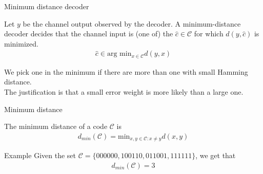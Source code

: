 \begin{parag}{Minimum distance decoder}
    \begin{definition}
        Let $y$ be the channel output observed by the decoder. A minimum-distance decoder decides that the channel input is (one of) the $\hat{c} \in \mathcal{C}$ for which $d\left(y, \hat{c}\right)$ is minimized.
        \begin{align*} \hat{c} \in \text{arg } \text{min}_{x \in \mathcal{C}}d\left(y, x\right)  \end{align*}
    \end{definition}
    We pick one in the minimum if there are more than one with small Hamming distance.\\
    The justification is that a small error weight is more likely than a large one.
\end{parag}
\begin{parag}{Minimum distance}
    \begin{definition}
    The minimum distance of a code $\mathcal{C}$ is
    \begin{align*} d_{min}\left(\mathcal{C}\right) = \text{min}_{x, y \in \mathcal{C}: x \neq y} d\left(x, y\right) \end{align*}
    \end{definition}
    \begin{subparag}{Example}
        Given the set $\mathcal{C} = \{000000, 100110, 011001, 111111\}$, we get that
        \begin{align*} d_{min}\left(\mathcal{C}\right) = 3 \end{align*}
    \end{subparag}
\end{parag}

